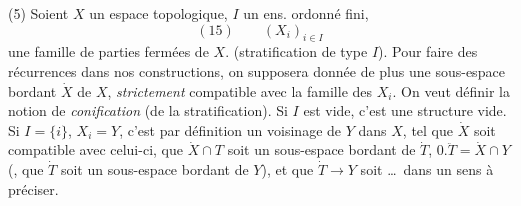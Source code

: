 \documentclass[11pt,a4paper]{article}
\begin{document}
(5) Soient $X$ un espace topologique, $I$ un ens. ordonné \struck{\ill{}} fini,
\[
(15)\qquad (X_i)_{i\in I}
\]
une famille  de parties fermées de $X$.  (stratification de type $I$). 
    Pour faire des récurrences dans nos constructions,   on supposera donnée de plus une sous-espace bordant $\dot X$ de $X$, \emph{strictement} compatible avec la famille des $X_i$. On veut définir la notion de \emph{conification}  (de la stratification). Si $I$ est vide, c'est une structure vide. Si $I=\lbrace i\rbrace$, $X_i=Y$, c'est par définition un \struck{\ill{}} voisinage \struck{\ill{}}  \add{\ill{}} de $Y$ dans $X$, \struck{\ill{}} tel que  $\dot X$ soit  compatible avec celui-ci,  que $\dot X\cap T$  soit un sous-espace bordant de $\dot T$,   $0.\ddot T=\dot X\cap Y$  (\struck{\ill{}}, que $\dot T$ soit un sous-espace bordant de $Y$), et que $\dot T\to Y$ soit \ldots\ dans un sens à préciser.
\end{document}
